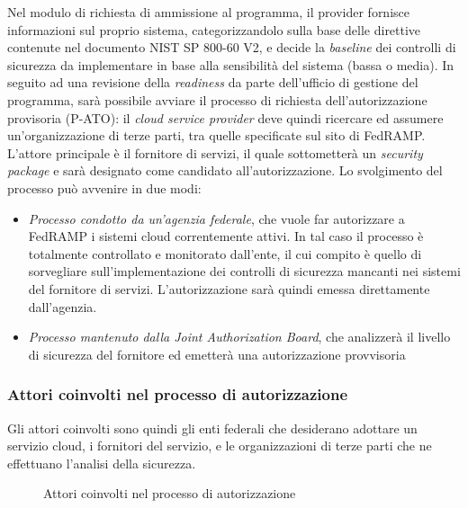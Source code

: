 \documentclass[../main.tex]{subfiles}
\begin{document}
Nel modulo di richiesta di ammissione al programma, il provider fornisce informazioni sul proprio sistema, categorizzandolo sulla base delle direttive contenute nel documento NIST SP 800-60 V2\cite{nist80060}, e decide la \textit{baseline} dei controlli di sicurezza da implementare in base alla sensibilità del sistema (bassa o media).
In seguito ad una revisione della \textit{readiness} da parte dell'ufficio di gestione del programma, sarà possibile avviare il processo di richiesta dell'autorizzazione provisoria (P-ATO): il \textit{cloud service provider} deve quindi ricercare ed assumere un'organizzazione di terze parti, tra quelle specificate sul sito di FedRAMP.
L'attore principale è il fornitore di servizi, il quale sottometterà un \textit{security package} e sarà designato come candidato all'autorizzazione. Lo svolgimento del processo può avvenire in due modi:
\begin{itemize}
    \item \textit{Processo condotto da un'agenzia federale}, che vuole far autorizzare a FedRAMP i sistemi cloud correntemente attivi. In tal caso il processo è totalmente controllato e monitorato dall'ente, il cui compito è quello di sorvegliare sull'implementazione dei controlli di sicurezza mancanti nei sistemi del fornitore di servizi. L'autorizzazione sarà quindi emessa direttamente dall'agenzia.
    \item \textit{Processo mantenuto dalla Joint Authorization Board}, che analizzerà il livello di sicurezza del fornitore ed emetterà una autorizzazione provvisoria
\end{itemize}

\vfill
\subsubsection{Attori coinvolti nel processo di autorizzazione}
Gli attori coinvolti sono quindi gli enti federali che desiderano adottare un servizio cloud, i fornitori del servizio, e le organizzazioni di terze parti che ne effettuano l'analisi della sicurezza.

\begin{figure}[H]
\centering
{}
\caption{Attori coinvolti nel processo di autorizzazione \cite{understandingFedRAMP} }\label{fig:fedrampactors}
\end{figure}
\end{document}
